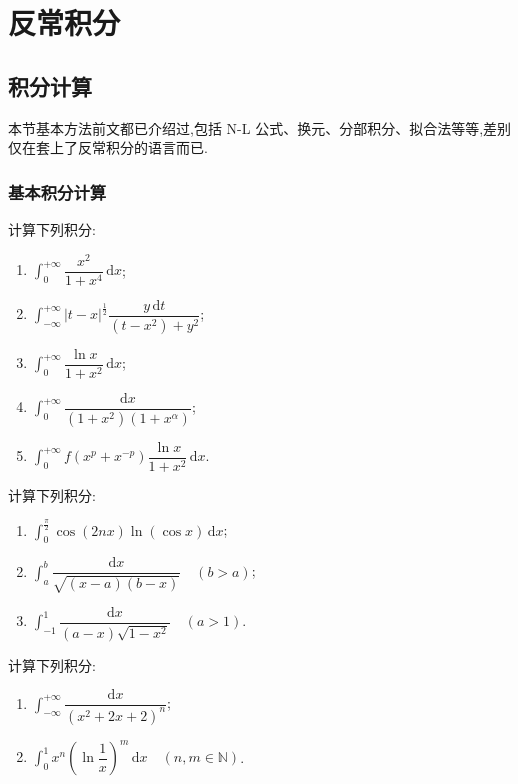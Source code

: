 \documentclass[../数学分析培优讲义.tex]{subfiles}
\begin{document}
\setcounter{chapter}{6}
\pagestyle{fancy}

\chapter{反常积分}


\section{积分计算}

本节基本方法前文都已介绍过,包括 N-L 公式、换元、分部积分、拟合法等等,差别仅在套上了反常积分的语言而已.


\newpage

\subsection{基本积分计算}

\begin{example}
计算下列积分:
\begin{enumerate}[label=(\arabic*)]
    \item $\displaystyle\int_0^{+\infty}\dfrac{x^2}{1+x^4}\,\mathrm{d}x$;
    \item $\displaystyle\int_{-\infty}^{+\infty}|t-x|^{\frac{1}{2}}
    \dfrac{y\,\mathrm{d}t}{(t-x^2)+y^2}$;
    \item $\displaystyle\int_0^{+\infty}\dfrac{\ln x}{1+x^2}\,\mathrm{d}x$;
    \item $\displaystyle\int_0^{+\infty}\dfrac{\mathrm{d}x}{(1+x^2)(1+x^\alpha)}$;
    \item $\displaystyle\int_0^{+\infty}f(x^p+x^{-p})\dfrac{\ln x}{1+x^2}\,\mathrm{d}x$.
\end{enumerate}
\end{example}
\exampleblank

\begin{example}
计算下列积分:
\begin{enumerate}[label=(\arabic*)]
    \item $\displaystyle\int_0^{\frac{\pi}{2}}\cos(2nx)\ln(\cos x)\,\mathrm{d}x$;
    \item $\displaystyle\int_a^b\dfrac{\mathrm{d}x}{\sqrt{(x-a)(b-x)}}\quad(b>a)$;
    \item $\displaystyle\int_{-1}^{1}\dfrac{\mathrm{d}x}{(a-x)\sqrt{1-x^2}}\quad(a>1)$.
\end{enumerate}
\end{example}
\exampleblank

\begin{example}
计算下列积分:
\begin{enumerate}[label=(\arabic*)]
    \item $\displaystyle\int_{-\infty}^{+\infty}\dfrac{\mathrm{d}x}{(x^2+2x+2)^n}$;
    \item $\displaystyle\int_0^1x^n\left(\ln\dfrac{1}{x}\right)^m\,\mathrm{d}x\quad(n,m\in\mathbb{N})$.
\end{enumerate}
\end{example}
\exampleblank
\end{document}

